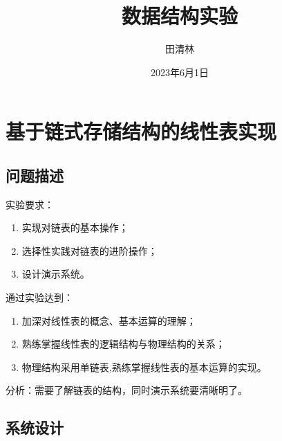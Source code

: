 \documentclass[supercite]{Experimental_Report}
\title{数据结构实验}
\author{田清林}
\date{2023年6月1日}
\theoremstyle{definition}
\begin{document}
		
\maketitle

\clearpage


\tableofcontents[level=2]

\clearpage

		
		
\section{基于链式存储结构的线性表实现}

\subsection{问题描述}
\noindent 实验要求：
\begin{enumerate}
	\item 实现对链表的基本操作；
	\item 选择性实践对链表的进阶操作；
	\item 设计演示系统。
\end{enumerate}
通过实验达到：
\begin{enumerate}
	\item 加深对线性表的概念、基本运算的理解；
	\item 熟练掌握线性表的逻辑结构与物理结构的关系；
	\item 物理结构采用单链表,熟练掌握线性表的基本运算的实现。
\end{enumerate}
分析：需要了解链表的结构，同时演示系统要清晰明了。

		\subsection{系统设计}
\end{document}
